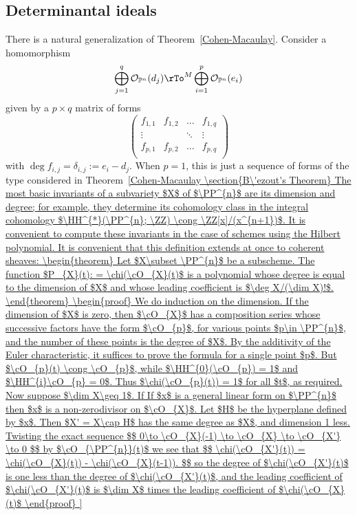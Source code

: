 \subsection{Determinantal ideals}
There is a natural generalization of Theorem~\ref{Cohen-Macaulay}. Consider a homomorphism
$$
\bigoplus_{j=1}^{q}\cO_{\PP^{n}}(d_{j}) \rTo^{M}
\bigoplus_{i=1}^{p}\cO_{\PP^{n}}(e_{i})
$$
given by a 
 $p\times q$ matrix of forms
$$
\begin{pmatrix}
 f_{1,1}&f_{1,2}&\dots&f_{1,q}\\
\vdots&&\ddots&\vdots\\
f_{p,1}&f_{p,2}&\dots&f_{p,q}\\
\end{pmatrix}
$$
with $\deg f_{i,j} = \delta_{i,j} := e_{i}-d_{j}$. When $p=1$, this is just a sequence of forms of the type considered
in Theorem~\ref{Cohen-Macaulay
\section{B\'ezout's Theorem}

The most basic invariants of a subvariety $X$ of $\PP^{n}$ are its dimension and degree; for example, they determine its cohomology class in the integral cohomology $\HH^{*}(\PP^{n}; \ZZ) \cong \ZZ[x]/(x^{n+1})$.  It is convenient to compute these invariants in the case of schemes using the Hilbert polynomial. It is convenient that this definition extends at once to coherent sheaves:

\begin{theorem}
 Let $X\subset \PP^{n}$ be a subscheme. The function
 $P_{X}(t): = \chi(\cO_{X}(t)$
 is a polynomial whose degree is equal to the dimension of $X$ and whose leading coefficient
is $\deg X/(\dim X)!$. 
\end{theorem}

\begin{proof}
 We do induction on the dimension. If the dimension of $X$ is zero, then $\cO_{X}$ has a composition series
 whose successive factors have the form $\cO_{p}$, for various points $p\in \PP^{n}$, and the number of these points
 is the degree of $X$. By the additivity of the Euler characteristic, it suffices to prove the formula for a single point $p$.
 But $\cO_{p}(t) \cong \cO_{p}$, while $\HH^{0}(\cO_{p}) = 1$ and $\HH^{i}\cO_{p} = 0$. Thus 
 $\chi(\cO_{p}(t)) = 1$ for all $t$, as required.
 
 Now suppose $\dim X\geq 1$. If
 If $x$ is a general linear form on $\PP^{n}$ then $x$ is a non-zerodivisor on 
 $\cO_{X}$. Let $H$ be the hyperplane defined by $x$. Then $X' = X\cap H$ has the same degree as $X$, and dimension
 1 less. Twisting the exact sequence
 $$
 0\to \cO_{X}(-1) \to \cO_{X} \to \cO_{X'} \to 0
 $$
 by $\cO_{\PP^{n}}(t)$ we see that 
 $$
\chi(\cO_{X'}(t)) =  \chi(\cO_{X}(t)) - \chi(\cO_{X}(t-1)).
 $$
so the degree of $\chi(\cO_{X'}(t)$ is one less than the degree of $\chi(\cO_{X'}(t)$, and the leading coefficient
of $\chi(\cO_{X'}(t)$ is $\dim X$  times the leading coefficient of $\chi(\cO_{X}(t)$
\end{proof}

}
